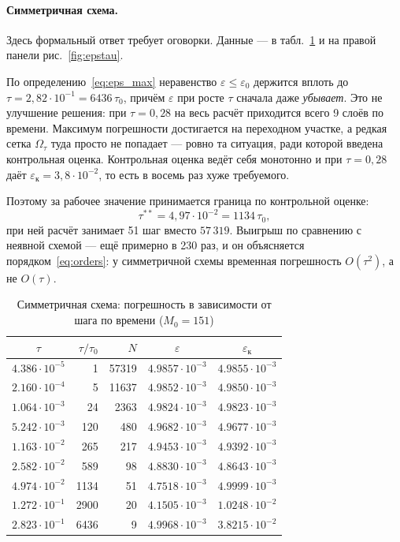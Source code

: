 \documentclass[12pt,a4paper]{article}
\begin{document}
\paragraph{Симметричная схема.} Здесь формальный ответ требует
оговорки. Данные --- в табл.~\ref{tab:epstau_sym} и на правой панели
рис.~\ref{fig:epstau}.

По определению~\eqref{eq:eps_max} неравенство
$\varepsilon\le\varepsilon_0$ держится вплоть до
$\tau=2{,}82\cdot10^{-1}=6436\,\tau_0$, причём $\varepsilon$ при росте
$\tau$ сначала даже \emph{убывает}. Это не улучшение решения: при
$\tau=0{,}28$ на весь расчёт приходится всего 9 слоёв по времени.
Максимум погрешности достигается на переходном участке, а редкая сетка
$\Omega_\tau$ туда просто не попадает --- ровно та ситуация, ради
которой введена контрольная оценка. Контрольная оценка ведёт себя
монотонно и при $\tau=0{,}28$ даёт
$\varepsilon_{\text{к}}=3{,}8\cdot10^{-2}$, то есть в восемь раз хуже
требуемого.

Поэтому за рабочее значение принимается граница по контрольной оценке:
\[
\tau^{**}=4{,}97\cdot10^{-2}=1134\,\tau_0 ,
\]
при ней расчёт занимает 51 шаг вместо $57\,319$. Выигрыш по сравнению с
неявной схемой --- ещё примерно в 230 раз, и он объясняется
порядком~\eqref{eq:orders}: у симметричной схемы временная погрешность
$O(\tau^2)$, а не $O(\tau)$.

\begin{table}[htbp]
\caption{Симметричная схема: погрешность в зависимости от шага по
времени ($M_0=151$)}
\label{tab:epstau_sym}
\centering
\begin{tabular}{c r r c c}
\toprule
$\tau$ & $\tau/\tau_0$ & $N$ & $\varepsilon$ &
$\varepsilon_{\text{к}}$\\
\midrule
$4.386\cdot10^{-5}$ & 1 & 57319 & $4.9857\cdot10^{-3}$ & $4.9855\cdot10^{-3}$ \\
$2.160\cdot10^{-4}$ & 5 & 11637 & $4.9852\cdot10^{-3}$ & $4.9850\cdot10^{-3}$ \\
$1.064\cdot10^{-3}$ & 24 & 2363 & $4.9824\cdot10^{-3}$ & $4.9823\cdot10^{-3}$ \\
$5.242\cdot10^{-3}$ & 120 & 480 & $4.9682\cdot10^{-3}$ & $4.9677\cdot10^{-3}$ \\
$1.163\cdot10^{-2}$ & 265 & 217 & $4.9453\cdot10^{-3}$ & $4.9392\cdot10^{-3}$ \\
$2.582\cdot10^{-2}$ & 589 & 98 & $4.8830\cdot10^{-3}$ & $4.8643\cdot10^{-3}$ \\
$4.974\cdot10^{-2}$ & 1134 & 51 & $4.7518\cdot10^{-3}$ & $4.9999\cdot10^{-3}$ \\
$1.272\cdot10^{-1}$ & 2900 & 20 & $4.1505\cdot10^{-3}$ & $1.0248\cdot10^{-2}$ \\
$2.823\cdot10^{-1}$ & 6436 & 9 & $4.9968\cdot10^{-3}$ & $3.8215\cdot10^{-2}$ \\
\bottomrule
\end{tabular}
\end{table}
\end{document}
